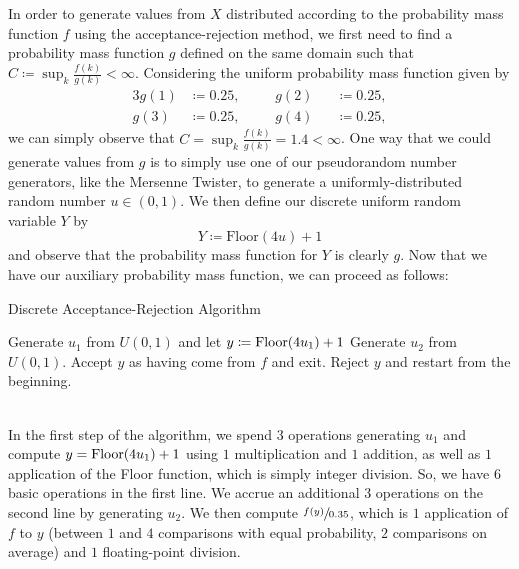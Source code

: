 \documentclass{article}
\renewcommand{\leq}{\leqslant}
\newcommand{\defn}{\coloneqq}
\DeclarePairedDelimiter \parens{(}{)}
\begin{document}
\begin{enumerate}
        In order to generate values from $X$ distributed according to the probability mass function $f$ using the acceptance-rejection method,
        we first need to find a probability mass function $g$ defined on the same domain such that $C \defn \sup_{k}\frac{f(k)}{g(k)} < \infty$.
        Considering the uniform probability mass function given by
        \begin{alignat*}{3}
            g(1) &\defn 0.25,   ~~~~&&g(2) &&\defn 0.25,\\
            g(3) &\defn 0.25,   ~~~~&&g(4) &&\defn 0.25,
        \end{alignat*}
        we can simply observe that $C = \sup_{k}\frac{f(k)}{g(k)} = 1.4 < \infty$.
        One way that we could generate values from $g$ is to simply use one of our pseudorandom number generators, like the Mersenne Twister,
        to generate a uniformly-distributed random number $u \in (0, 1)$.
        We then define our discrete uniform random variable $Y$ by
        \begin{equation*}
            Y \defn \text{Floor}(4u) + 1
        \end{equation*}
        and observe that the probability mass function for $Y$ is clearly $g$.
        Now that we have our auxiliary probability mass function, we can proceed as follows:\\
        \begin{minipage}{.95\textwidth}
            \begin{algorithm}[H]
                \caption{Discrete Acceptance-Rejection Algorithm}
                \begin{algorithmic}
                    \STATE Generate $u_1$ from $U(0, 1)$ and let $y \defn \text{Floor}\parens*{4u_1} + 1$
                    \STATE Generate $u_2$ from $U(0, 1)$.
                    \IF{$u_2 \leq \frac{f(y)}{Cg(y)} = \frac{f(y)}{0.35}$}
                        Accept $y$ as having come from $f$ and exit.
                    \ELSE
                        Reject $y$ and restart from the beginning.
                    \ENDIF
                \end{algorithmic}
            \end{algorithm}
        \end{minipage}\\

        In the first step of the algorithm, we spend $3$ operations generating $u_1$ and compute $y = \text{Floor}\parens*{4u_1} + 1$
        using $1$ multiplication and $1$ addition, as well as $1$ application of the Floor function, which is simply integer division.
        So, we have $6$ basic operations in the first line.
        We accrue an additional $3$ operations on the second line by generating $u_2$.
        We then compute $\sfrac{f(y)}{0.35}$, which is $1$ application of $f$ to $y$ (between $1$ and $4$ comparisons with equal probability, $2$ comparisons on average)
        and $1$ floating-point division.


\end{enumerate}
\end{document}
